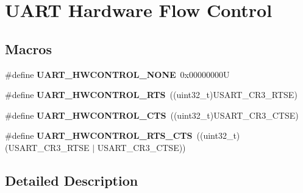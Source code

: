 \hypertarget{group___u_a_r_t___hardware___flow___control}{}\section{U\+A\+RT Hardware Flow Control}
\label{group___u_a_r_t___hardware___flow___control}
\subsection*{Macros}
\begin{DoxyCompactItemize}
\item 
\mbox{\label{group___u_a_r_t___hardware___flow___control_gae0569001c06b7760cd38c481f84116cf}} 
\#define {\bfseries U\+A\+R\+T\+\_\+\+H\+W\+C\+O\+N\+T\+R\+O\+L\+\_\+\+N\+O\+NE}~0x00000000U
\item 
\mbox{\label{group___u_a_r_t___hardware___flow___control_ga6d5dad09c6abf30f252084ba0f8c0b7d}} 
\#define {\bfseries U\+A\+R\+T\+\_\+\+H\+W\+C\+O\+N\+T\+R\+O\+L\+\_\+\+R\+TS}~((uint32\+\_\+t)U\+S\+A\+R\+T\+\_\+\+C\+R3\+\_\+\+R\+T\+SE)
\item 
\mbox{\label{group___u_a_r_t___hardware___flow___control_ga352f517245986e3b86bc75f8472c51ea}} 
\#define {\bfseries U\+A\+R\+T\+\_\+\+H\+W\+C\+O\+N\+T\+R\+O\+L\+\_\+\+C\+TS}~((uint32\+\_\+t)U\+S\+A\+R\+T\+\_\+\+C\+R3\+\_\+\+C\+T\+SE)
\item 
\mbox{\label{group___u_a_r_t___hardware___flow___control_ga7c91698e8f08ba7ed3f2a0ba9aa27d73}} 
\#define {\bfseries U\+A\+R\+T\+\_\+\+H\+W\+C\+O\+N\+T\+R\+O\+L\+\_\+\+R\+T\+S\+\_\+\+C\+TS}~((uint32\+\_\+t)(U\+S\+A\+R\+T\+\_\+\+C\+R3\+\_\+\+R\+T\+SE $\vert$ U\+S\+A\+R\+T\+\_\+\+C\+R3\+\_\+\+C\+T\+SE))
\end{DoxyCompactItemize}


\subsection{Detailed Description}

